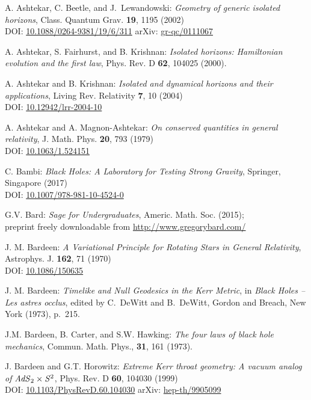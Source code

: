 \begin{thebibliography}{123}
A. Ashtekar, C. Beetle, and J.~Lewandowski:
{\em Geometry of generic isolated horizons},
Class. Quantum Grav. {\bf 19}, 1195 (2002)\\
DOI: \href{https://doi.org/10.1088/0264-9381/19/6/311}{10.1088/0264-9381/19/6/311}\hfill
arXiv: \href{https://arxiv.org/abs/gr-qc/0111067}{gr-qc/0111067}

A. Ashtekar, S. Fairhurst, and B. Krishnan: {\em Isolated horizons:
Hamiltonian evolution and the first law},
Phys. Rev. D {\bf 62}, 104025 (2000).

A. Ashtekar and B. Krishnan: {\em Isolated and dynamical horizons
and their applications},
Living Rev. Relativity {\bf 7}, 10 (2004)\\
DOI: \href{https://doi.org/10.12942/lrr-2004-10}{10.12942/lrr-2004-10}

A. Ashtekar and A. Magnon-Ashtekar:
{\em On conserved quantities in general relativity},
J. Math. Phys. {\bf 20}, 793 (1979)\\
DOI: \href{https://doi.org/10.1063/1.524151}{10.1063/1.524151}

C. Bambi: {\em Black Holes: A Laboratory for Testing Strong Gravity},
Springer, Singapore (2017)\\
DOI: \href{https://doi.org/10.1007/978-981-10-4524-0}{10.1007/978-981-10-4524-0}

G.V. Bard: {\em Sage for Undergraduates}, Americ. Math. Soc. (2015); \\
preprint freely downloadable from \url{http://www.gregorybard.com/}

J. M. Bardeen: {\em A Variational Principle for Rotating Stars in General Relativity},
Astrophys. J. {\bf  162}, 71 (1970)\\
DOI: \href{https://doi.org/10.1086/150635}{10.1086/150635}

J. M. Bardeen: {\em Timelike and Null Geodesics in the Kerr Metric},
in {\em Black Holes -- Les astres occlus},  edited by C.~DeWitt and B.~DeWitt,
Gordon and Breach, New York (1973), p.~215.

J.M. Bardeen, B. Carter, and S.W. Hawking: {\em The four laws of black
hole mechanics}, Commun. Math. Phys., {\bf 31}, 161 (1973).

J. Bardeen and G.T. Horowitz:
{\em Extreme Kerr throat geometry: A vacuum analog of ${\it AdS}_2\times{\it S}^2$},
Phys. Rev. D {\bf 60}, 104030 (1999)\\
DOI: \href{https://doi.org/10.1103/PhysRevD.60.104030}{10.1103/PhysRevD.60.104030}\hfill
arXiv: \href{https://arxiv.org/abs/hep-th/9905099}{hep-th/9905099}


\end{thebibliography}
